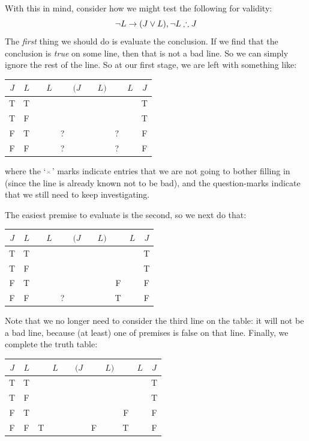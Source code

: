 With this in mind, consider how we might test the following for validity:
$$\enot L \eif (J \eor L), \enot L \therefore J$$
The \emph{first} thing we should do is evaluate the conclusion. If we find that the conclusion is \emph{true} on some line, then that is not a bad line. So we can simply ignore the rest of the line. So at our first stage, we are left with something like:
\begin{center}
	\begin{tabular}{c c|d e e e e f |d f|c}
		$J$&$L$&\enot&$L$&\eif&$(J$&\eor&$L)$&\enot&$L$&$J$\\
		\hline
			T & T & &&   \TTcross&& & &\TTcross & & {T}\\
			T & F & &&   \TTcross && & &\TTcross & & {T}\\
		F & T & &&?&&&&?&& {F}\\
		F & F & &&?&&&&?&& {F}
	\end{tabular}
\end{center}
where the `$\TTcross$' marks indicate entries that we are not going to bother filling in (since the line is already known not to be bad), and the question-marks indicate that we still need to keep investigating.

The easiest premise to evaluate is the second, so we next do that:
\begin{center}
	\begin{tabular}{c c|d e e e e f |d f|c}
		$J$&$L$&\enot&$L$&\eif&$(J$&\eor&$L)$&\enot&$L$&$J$\\
		\hline
			T & T && & \TTcross& & & & \TTcross  & & {T}\\
			T & F && & \TTcross& & & & \TTcross  & & {T}\\
		F & T & &&\TTcross&&&&{F}&& {F}\\
		F & F & &&?&&&&{T}&& {F}
	\end{tabular}
\end{center}
Note that we no longer need to consider the third line on the table: it will not be a bad line, because (at least) one of premises is false on that line. Finally, we complete the truth table:
\begin{center}
	\begin{tabular}{c c|d e e e e f |d f|c}
		$J$&$L$&\enot&$L$&\eif&$(J$&\eor&$L)$&\enot&$L$&$J$\\
		\hline
		T & T & & & \TTcross & & &  &\TTcross & & {T}\\
		T & F & & & \TTcross & & &  &\TTcross & & {T}\\
		F & T & &&\TTcross&&&&{F}& & {F}\\
		F & F & T &  &  &  & F & & {T} & & {F}
	\end{tabular}
\end{center}

